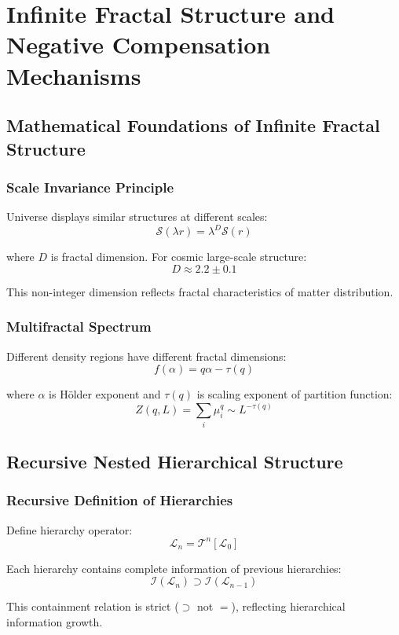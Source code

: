 \documentclass[11pt]{article}
\begin{document}
\section{Infinite Fractal Structure and Negative Compensation Mechanisms}

\subsection{Mathematical Foundations of Infinite Fractal Structure}

\subsubsection{Scale Invariance Principle}

Universe displays similar structures at different scales:
$$\mathcal{S}(\lambda r) = \lambda^D \mathcal{S}(r)$$

where $D$ is fractal dimension. For cosmic large-scale structure:
$$D \approx 2.2 \pm 0.1$$

This non-integer dimension reflects fractal characteristics of matter distribution.

\subsubsection{Multifractal Spectrum}

Different density regions have different fractal dimensions:
$$f(\alpha) = q\alpha - \tau(q)$$

where $\alpha$ is Hölder exponent and $\tau(q)$ is scaling exponent of partition function:
$$Z(q,L) = \sum_i \mu_i^q \sim L^{-\tau(q)}$$

\subsection{Recursive Nested Hierarchical Structure}

\subsubsection{Recursive Definition of Hierarchies}

Define hierarchy operator:
$$\mathcal{L}_n = \mathcal{T}^n[\mathcal{L}_0]$$

Each hierarchy contains complete information of previous hierarchies:
$$\mathcal{I}(\mathcal{L}_n) \supset \mathcal{I}(\mathcal{L}_{n-1})$$

This containment relation is strict ($\supset$ not $=$), reflecting hierarchical information growth.
\end{document}
